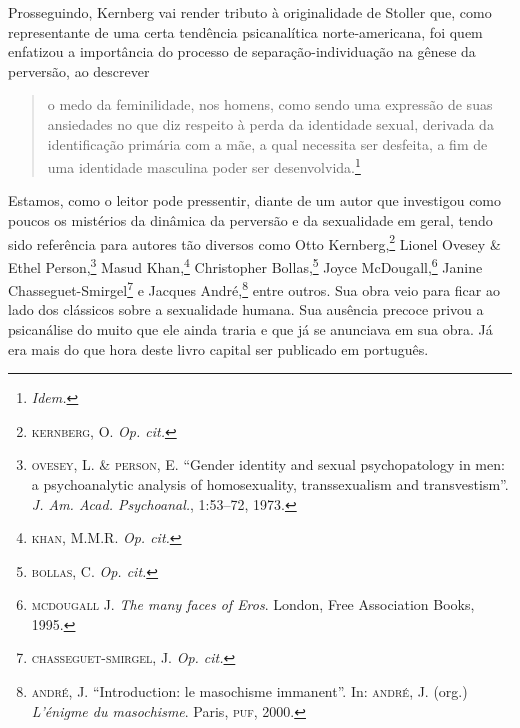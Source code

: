 Prosseguindo, Kernberg vai render tributo à originalidade de Stoller
que, como representante de uma certa tendência psicanalítica
norte-americana, foi quem enfatizou a importância do processo de
separação-individuação na gênese da perversão, ao descrever

\begin{quote}
o medo da feminilidade, nos homens, como sendo uma expressão de suas
ansiedades no que diz respeito à perda da identidade sexual, derivada da
identificação primária com a mãe, a qual necessita ser desfeita, a fim
de uma identidade masculina poder ser desenvolvida.\footnote{\emph{Idem.}}
\end{quote}

Estamos, como o leitor pode pressentir, diante de um autor que
investigou como poucos os mistérios da dinâmica da perversão e da
sexualidade em geral, tendo sido referência para autores tão diversos
como Otto Kernberg,\footnote{\textsc{kernberg}, O. \emph{Op. cit.}}
Lionel Ovesey \& Ethel Person,\footnote{\textsc{ovesey}, L. \&
  \textsc{person}, E. ``Gender identity and sexual psychopatology in
  men: a psychoanalytic analysis of homosexuality, transsexualism and
  transvestism''. \emph{J. Am. Acad. Psychoanal.}, 1:53--72, 1973.}
Masud Khan,\footnote{\textsc{khan}, M.M.R. \emph{Op. cit.}} Christopher
Bollas,\footnote{\textsc{bollas}, C. \emph{Op. cit.}} Joyce
McDougall,\footnote{\textsc{mcdougall} J. \emph{The many faces of Eros}.
  London, Free Association Books, 1995.} Janine
Chasseguet-Smirgel\footnote{\textsc{chasseguet-smirgel}, J. \emph{Op.
  cit.}} e Jacques André,\footnote{\textsc{andré}, J. ``Introduction: le
  masochisme immanent''. In: \textsc{andré}, J. (org.) \emph{L'énigme du
  masochisme}. Paris, \textsc{puf}, 2000.} entre outros. Sua obra veio
para ficar ao lado dos clássicos sobre a sexualidade humana. Sua
ausência precoce privou a psicanálise do muito que ele ainda traria e
que já se anunciava em sua obra. Já era mais do que hora deste livro
capital ser publicado em português.
